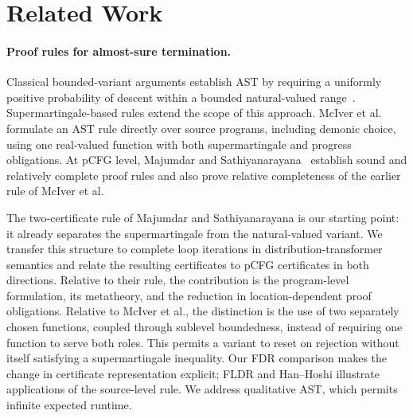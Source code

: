 \section{Related Work}
\label{sec:relwork}

\paragraph{Proof rules for almost-sure termination.}
Classical bounded-variant arguments establish AST by requiring a uniformly positive probability of descent within a bounded natural-valued range~\cite{DBLP:series/mcs/McIverM05}. Supermartingale-based rules extend the scope of this approach. McIver et al.~\cite{10.1145/3158121} formulate an AST rule directly over source programs, including demonic choice, using one real-valued function with both supermartingale and progress obligations. At pCFG level, Majumdar and Sathiyanarayana~\cite{DBLP:journals/pacmpl/MajumdarS25} establish sound and relatively complete proof rules and also prove relative completeness of the earlier rule of McIver et al.

The two-certificate rule of Majumdar and Sathiyanarayana is our starting point: it already separates the supermartingale from the natural-valued variant. We transfer this structure to complete loop iterations in distribution-transformer semantics and relate the resulting certificates to pCFG certificates in both directions. Relative to their rule, the contribution is the program-level formulation, its metatheory, and the reduction in location-dependent proof obligations. Relative to McIver et al., the distinction is the use of two separately chosen functions, coupled through sublevel boundedness, instead of requiring one function to serve both roles. This permits a variant to reset on rejection without itself satisfying a supermartingale inequality. Our FDR comparison makes the change in certificate representation explicit; FLDR and Han--Hoshi illustrate applications of the source-level rule. We address qualitative AST, which permits infinite expected runtime.


